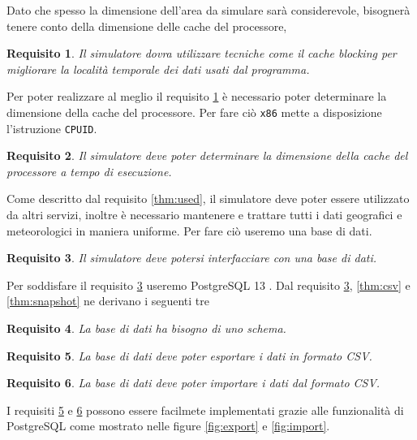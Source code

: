 \documentclass[draft]{article}
\newcommand{\eng}[1]{\foreignlanguage{english}{#1}} %
\newtheorem{requirement}{Requisito}
\begin{document}
Dato che spesso la dimensione dell'area da simulare sarà considerevole,
bisognerà tenere conto della dimensione delle \eng{cache} del processore,

\begin{requirement}\label{thm:blocking}
Il simulatore dovra utilizzare tecniche come il \eng{cache blocking} per
migliorare la località temporale dei dati usati dal programma.
\end{requirement}

Per poter realizzare al meglio il requisito \ref{thm:blocking} è necessario
poter determinare la dimensione della \eng{cache} del processore. Per fare ciò
\texttt{x86} mette a disposizione l'istruzione \texttt{CPUID}.

\begin{requirement}
Il simulatore deve poter determinare la dimensione della \eng{cache} del
processore a tempo di esecuzione.
\end{requirement}

Come descritto dal requisito \ref{thm:used}, il simulatore deve poter essere
utilizzato da altri servizi, inoltre è necessario mantenere e trattare tutti i
dati geografici e meteorologici in maniera uniforme. Per fare ciò useremo una
base di dati.

\begin{requirement}\label{thm:db}
Il simulatore deve potersi interfacciare con una base di dati.
\end{requirement}

Per soddisfare il requisito \ref{thm:db} useremo PostgreSQL 13 \cite{psql}. Dal
requisito \ref{thm:db}, \ref{thm:csv} e \ref{thm:snapshot} ne derivano i
seguenti tre

\begin{requirement}
La base di dati ha bisogno di uno schema.
\end{requirement}

\begin{requirement}\label{thm:export}
La base di dati deve poter esportare i dati in formato CSV.
\end{requirement}

\begin{requirement}\label{thm:import}
La base di dati deve poter importare i dati dal formato CSV.
\end{requirement}

I requisiti \ref{thm:export} e \ref{thm:import} possono essere facilmete
implementati grazie alle funzionalità di PostgreSQL come mostrato nelle figure
\ref{fig:export} e \ref{fig:import}.
\end{document}
